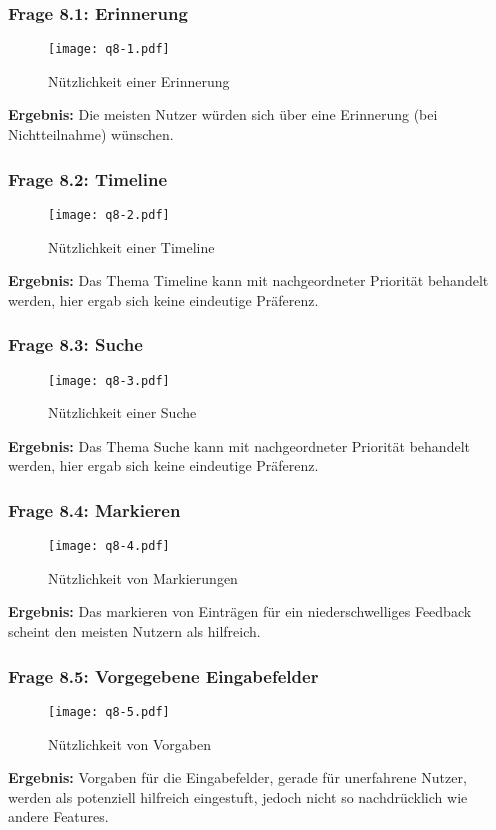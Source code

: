 \subsubsection{Frage 8.1: Erinnerung}
\begin{figure}[H]
	\centering
	\texttt{[image: q8-1.pdf]}
    \caption{Nützlichkeit einer Erinnerung}
	\label{fig:q81}
\end{figure} 
\textbf{Ergebnis:} Die meisten Nutzer würden sich über eine Erinnerung (bei Nichtteilnahme) wünschen.
\subsubsection{Frage 8.2: Timeline}
\begin{figure}[H]
	\centering
	\texttt{[image: q8-2.pdf]}
    \caption{Nützlichkeit einer Timeline}
	\label{fig:q82}
\end{figure} 
\textbf{Ergebnis:} Das Thema Timeline kann mit nachgeordneter Priorität behandelt werden, hier ergab sich keine eindeutige Präferenz.
\subsubsection{Frage 8.3: Suche}
\begin{figure}[H]
	\centering
	\texttt{[image: q8-3.pdf]}
    \caption{Nützlichkeit einer Suche}
	\label{fig:q83}
\end{figure} 
\textbf{Ergebnis:} Das Thema Suche kann mit nachgeordneter Priorität behandelt werden, hier ergab sich keine eindeutige Präferenz.

\subsubsection{Frage 8.4: Markieren}
\begin{figure}[H]
	\centering
	\texttt{[image: q8-4.pdf]}
    \caption{Nützlichkeit von Markierungen}
	\label{fig:q84}
\end{figure} 
\textbf{Ergebnis:} Das markieren von Einträgen für ein niederschwelliges Feedback scheint den meisten Nutzern als hilfreich.
\subsubsection{Frage 8.5: Vorgegebene Eingabefelder}
\begin{figure}[H]
	\centering
	\texttt{[image: q8-5.pdf]}
    \caption{Nützlichkeit von Vorgaben}
	\label{fig:q85}
\end{figure}
\textbf{Ergebnis:} Vorgaben für die Eingabefelder, gerade für unerfahrene Nutzer, werden als potenziell hilfreich eingestuft, jedoch nicht so nachdrücklich wie andere Features.

